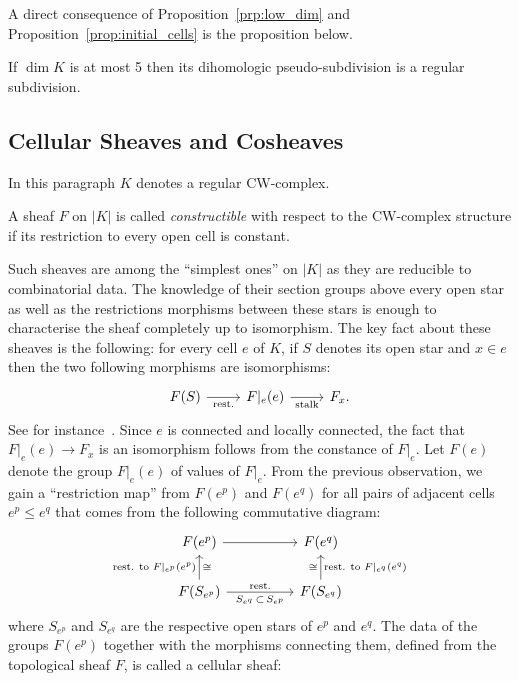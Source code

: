\documentclass[AHL,Unicode,longabstracts,published]{cedram}
\begin{document}
\pagebreak
A direct consequence of Proposition~\ref{prp:low_dim} and Proposition~\ref{prop:initial_cells} is the proposition below.

\begin{prop}
If $\dim K$ is at most 5 then its dihomologic pseudo-subdivi\-sion is a regular subdivision.
\end{prop}

\subsection{Cellular Sheaves and Cosheaves}

In this paragraph $K$ denotes a regular CW-complex.

\begin{defi}
A sheaf $F$ on $|K|$ is called \emph{constructible} with respect to the CW-complex structure if its restriction to every open cell is constant.
\end{defi}

Such sheaves are among the ``simplest ones'' on $|K|$ as they are reducible to combinatorial data. The knowledge of their section groups above every open star as well as the restrictions morphisms between these stars is enough to characterise the sheaf completely up to isomorphism. The key fact about these sheaves is the following: for every cell $e$ of $K$, if $S$ denotes its open star and $x\in e$ then the two following morphisms are isomorphisms:
\begin{equation*}
\begin{tikzcd}
F(S)\arrow[r,"\text{rest.}" below] & F|_e(e) \ar[r, "\text{stalk}" below] & F_x.
\end{tikzcd}
\end{equation*}
See for instance~\cite[Proposition~1.3 p.~323]{Kas_rie_hil}. Since $e$ is connected and locally connected, the fact that $F|_e(e) \rightarrow F_x$ is an isomorphism follows from the constance of $F|_e$. Let $F(e)$ denote the group $F|_e(e)$ of values of $F|_e$. From the previous observation, we gain a ``restriction map'' from $F(e^p)$ and $F(e^q)$ for all pairs of adjacent cells $e^p\leq e^q$ that comes from the following commutative diagram:
\begin{equation*}
\begin{tikzcd}
F(e^p) \arrow[rr] & & F(e^q) \\
F(S_{e^p}) \arrow[u,"\text{rest. to }F|_{e^p}(e^p)" left, "\cong " right] \arrow[rr, "S_{e^q}\,\subset\,S_{e^p}" below, "\text{rest.}" above] & & F(S_{e^q}) \ar[u, "\text{rest. to }F|_{e^q}(e^q)" right, "\cong" left]
\end{tikzcd}
\end{equation*}
where $S_{e^p}$ and $S_{e^q}$ are the respective open stars of $e^p$ and $e^q$. The data of the groups $F(e^p)$ together with the morphisms connecting them, defined from the topological sheaf $F$, is called a cellular sheaf:
\end{document}
